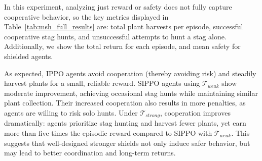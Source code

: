 \documentclass{ecai}
\theoremstyle{plain}
\theoremstyle{definition}
\theoremstyle{remark}
\begin{document}
In this experiment, analyzing just reward or safety does not fully capture cooperative behavior, so the key metrics displayed in Table~\ref{tab:msh_full_results} are: total plant harvests per episode, successful cooperative stag hunts, and unsuccessful attempts to hunt a stag alone. Additionally, we show the total return for each episode, and mean safety for shielded agents. 

As expected, IPPO agents avoid cooperation (thereby avoiding risk) and steadily harvest plants for a small, reliable reward. SIPPO agents using $\mathcal{T}_{weak}$ show moderate improvement, achieving occasional stag hunts while maintaining similar plant collection. Their increased cooperation also results in more penalties, as agents are willing to risk solo hunts. Under $\mathcal{T}_{strong}$, cooperation improves dramatically: agents prioritize stag hunting and harvest fewer plants, yet earn more than five times the episodic reward compared to SIPPO with $\mathcal{T}_{weak}$. This suggests that well-designed stronger shields not only induce safer behavior, but may lead to better coordination and long-term returns.

\end{document}
